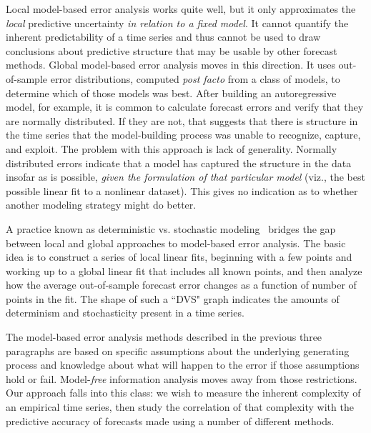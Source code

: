 Local model-based error analysis works quite well, but it only
approximates the \emph{local} predictive uncertainty \emph{in relation
  to a fixed model}.  It cannot quantify the inherent predictability
of a time series and thus cannot be used to draw conclusions about
predictive structure that may be usable by other forecast methods.
%
%
Global model-based error analysis moves in this direction.  It uses
out-of-sample error distributions, computed \emph{post facto} from a
class of models, to determine which of those models was best.  After
building an autoregressive model, for example, it is common to
calculate forecast errors and verify that they are normally
distributed.  If they are not, that suggests that there is structure
in the time series that the model-building process was unable to
recognize, capture, and exploit.  The problem with this approach is
lack of generality.
\label{page:normal-errors}
Normally distributed errors indicate that a model has captured the
structure in the data insofar as is possible, \emph{given the
  formulation of that particular model} (viz., the best possible
linear fit to a nonlinear dataset).  This gives no indication as to
whether another modeling strategy might do better.


A practice known as deterministic vs. stochastic
modeling~\cite{weigend93, Casdagli92dvsplots} bridges the gap
between local and global approaches to model-based error analysis.
The basic idea is to construct a series of local linear fits,
beginning with a few points and working up to a global linear fit that
includes all known points, and then analyze how the average
out-of-sample forecast error changes as a function of number of points
in the fit. The shape of such a ``DVS" graph indicates the amounts of
determinism and stochasticity present in a time series.

The model-based error analysis methods described in the previous three
paragraphs are based on specific assumptions about the underlying
generating process and knowledge about what will happen to the error
if those assumptions hold or fail.  Model-\emph{free} information
analysis moves away from those restrictions.  Our approach falls into
this class: we wish to measure the inherent complexity of an empirical
time series, then study the correlation of that complexity with the
predictive accuracy of forecasts made using a number of different
methods.


